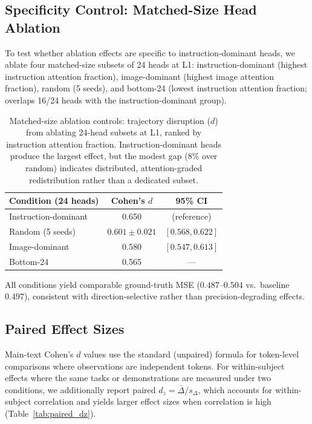 \subsection{Specificity Control: Matched-Size Head Ablation}
To test whether ablation effects are specific to instruction-dominant heads, we ablate four matched-size subsets of 24 heads at L1: instruction-dominant (highest instruction attention fraction), image-dominant (highest image attention fraction), random (5 seeds), and bottom-24 (lowest instruction attention fraction; overlaps 16/24 heads with the instruction-dominant group).

\begin{table}[h]
\centering
\caption{Matched-size ablation controls: trajectory disruption ($d$) from ablating 24-head subsets at L1, ranked by instruction attention fraction. Instruction-dominant heads produce the largest effect, but the modest gap ($8\%$ over random) indicates distributed, attention-graded redistribution rather than a dedicated subset.}
\label{tab:specificity_control}
\small
\begin{tabular}{lcc}
\toprule
\textbf{Condition (24 heads)} & \textbf{Cohen's $d$} & \textbf{95\% CI} \\
\midrule
Instruction-dominant & 0.650 & (reference) \\
Random (5 seeds) & $0.601 \pm 0.021$ & $[0.568, 0.622]$ \\
Image-dominant & 0.580 & $[0.547, 0.613]$ \\
Bottom-24 & 0.565 & --- \\
\bottomrule
\end{tabular}
\end{table}

All conditions yield comparable ground-truth MSE ($0.487$--$0.504$ vs.\ baseline $0.497$), consistent with direction-selective rather than precision-degrading effects.

\subsection{Paired Effect Sizes}
Main-text Cohen's $d$ values use the standard (unpaired) formula for token-level comparisons where observations are independent tokens.
For within-subject effects where the same tasks or demonstrations are measured under two conditions, we additionally report paired $d_z = \bar{\Delta} / s_\Delta$, which accounts for within-subject correlation and yields larger effect sizes when correlation is high (Table~\ref{tab:paired_dz}).

